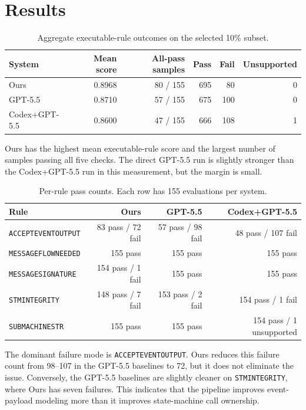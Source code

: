 \documentclass[11pt]{article}
\newcommand{\code}[1]{\texttt{\small #1}}
\begin{document}
\section{Results}

\begin{table}[h]
\centering
\caption{Aggregate executable-rule outcomes on the selected 10\% subset.}
\begin{tabular}{lrrrrr}
\toprule
System & Mean score & All-pass samples & Pass & Fail & Unsupported \\
\midrule
Ours & 0.8968 & 80 / 155 & 695 & 80 & 0 \\
GPT-5.5 & 0.8710 & 57 / 155 & 675 & 100 & 0 \\
Codex+GPT-5.5 & 0.8600 & 47 / 155 & 666 & 108 & 1 \\
\bottomrule
\end{tabular}
\end{table}

Ours has the highest mean executable-rule score and the largest number of
samples passing all five checks. The direct GPT-5.5 run is slightly stronger
than the Codex+GPT-5.5 run in this measurement, but the margin is small.

\begin{table}[h]
\centering
\caption{Per-rule pass counts. Each row has 155 evaluations per system.}
\begin{tabular}{lrrr}
\toprule
Rule & Ours & GPT-5.5 & Codex+GPT-5.5 \\
\midrule
\code{ACCEPTEVENTOUTPUT} & 83 pass / 72 fail & 57 pass / 98 fail & 48 pass / 107 fail \\
\code{MESSAGEFLOWNEEDED} & 155 pass & 155 pass & 155 pass \\
\code{MESSAGESIGNATURE} & 154 pass / 1 fail & 155 pass & 155 pass \\
\code{STMINTEGRITY} & 148 pass / 7 fail & 153 pass / 2 fail & 154 pass / 1 fail \\
\code{SUBMACHINESTR} & 155 pass & 155 pass & 154 pass / 1 unsupported \\
\bottomrule
\end{tabular}
\end{table}

The dominant failure mode is \code{ACCEPTEVENTOUTPUT}. Ours reduces this
failure count from 98--107 in the GPT-5.5 baselines to 72, but it does not
eliminate the issue. Conversely, the GPT-5.5 baselines are slightly cleaner on
\code{STMINTEGRITY}, where Ours has seven failures. This indicates that the
pipeline improves event-payload modeling more than it improves state-machine
call ownership.
\end{document}
